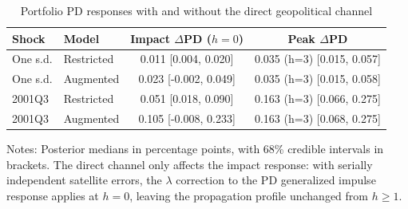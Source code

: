 \begin{table}[!htbp]
\centering
\caption{Portfolio PD responses with and without the direct geopolitical channel}
\label{tab:direct_channel_pd}
\begin{tabular}{llcc}
\toprule
Shock & Model & Impact $\Delta$PD ($h=0$) & Peak $\Delta$PD \\
\midrule
One s.d. & Restricted & 0.011 [0.004, 0.020] & 0.035 (h=3) [0.015, 0.057] \\
One s.d. & Augmented & 0.023 [-0.002, 0.049] & 0.035 (h=3) [0.015, 0.058] \\
\midrule
2001Q3 & Restricted & 0.051 [0.018, 0.090] & 0.163 (h=3) [0.066, 0.275] \\
2001Q3 & Augmented & 0.105 [-0.008, 0.233] & 0.163 (h=3) [0.068, 0.275] \\
\bottomrule
\end{tabular}
\begin{tablenotes}
\small
\item Notes: Posterior medians in percentage points, with 68\% credible intervals in brackets. The direct channel only affects the impact response: with serially independent satellite errors, the $\lambda$ correction to the PD generalized impulse response applies at $h = 0$, leaving the propagation profile unchanged from $h \geq 1$.
\end{tablenotes}
\end{table}
